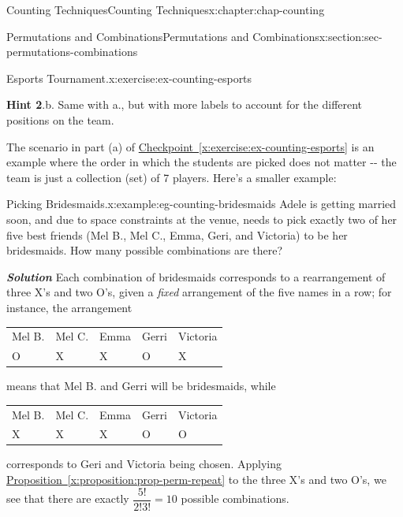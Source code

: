 \documentclass[oneside,10pt,]{book}
\newcommand{\blocktitlefont}{\relax}
\newcommand{\tabularfont}{\relax}
\newcommand{\xreffont}{\relax}
\newcommand{\alert}[1]{\textbf{\textit{#1}}}
\numberwithin{equation}{section}
\begin{document}
\begin{chapterptx}{Counting Techniques}{}{Counting Techniques}{}{}{x:chapter:chap-counting}
\begin{sectionptx}{Permutations and Combinations}{}{Permutations and Combinations}{}{}{x:section:sec-permutations-combinations}
\begin{inlineexercise}{Esports Tournament.}{x:exercise:ex-counting-esports}
\par\smallskip%
\noindent\textbf{\blocktitlefont Hint 2}.\hypertarget{g:hint:id472033}{}\quad{}b. Same with a., but with more labels to account for the different positions on the team.%
\end{inlineexercise}
The scenario in part (a) of \hyperref[x:exercise:ex-counting-esports]{Checkpoint~{\xreffont\ref{x:exercise:ex-counting-esports}}} is an example where the order in which the students are picked does not matter -{}-{} the team is just a collection (set) of 7 players. Here's a smaller example:%
\begin{example}{Picking Bridesmaids.}{x:example:eg-counting-bridesmaids}%
Adele is getting married soon, and due to space constraints at the venue, needs to pick exactly two of her five best friends (Mel B., Mel C., Emma, Geri, and Victoria) to be her bridesmaids. How many possible combinations are there?%
\par
\alert{Solution} Each combination of bridesmaids corresponds to a rearrangement of three X's and two O's, given a \emph{fixed} arrangement of the five names in a row; for instance, the arrangement%
\begin{sidebyside}{1}{0.225}{0.225}{0}%
\begin{sbspanel}{0.55}%
{\centering%
{\tabularfont%
\begin{tabular}{lllll}
Mel B.&Mel C.&Emma&Gerri&Victoria\tabularnewline[0pt]
O&X&X&O&X
\end{tabular}
}%
\par}
\end{sbspanel}%
\end{sidebyside}%
\par
means that Mel B. and Gerri will be bridesmaids, while%
\begin{sidebyside}{1}{0.225}{0.225}{0}%
\begin{sbspanel}{0.55}%
{\centering%
{\tabularfont%
\begin{tabular}{lllll}
Mel B.&Mel C.&Emma&Gerri&Victoria\tabularnewline[0pt]
X&X&X&O&O
\end{tabular}
}%
\par}
\end{sbspanel}%
\end{sidebyside}%
\par
corresponds to Geri and Victoria being chosen. Applying \hyperref[x:proposition:prop-perm-repeat]{Proposition~{\xreffont\ref{x:proposition:prop-perm-repeat}}} to the three X's and two O's, we see that there are exactly \(\dfrac{5!}{2! 3!} = 10\) possible combinations.%

\end{example}
\end{sectionptx}
\end{chapterptx}
\end{document}
